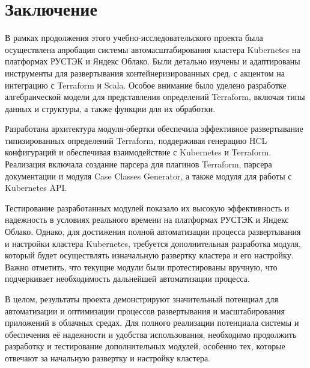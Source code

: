 \chapter*{Заключение}

В рамках продолжения этого учебно-исследовательского проекта была осуществлена
апробация системы автомасштабирования кластера Kubernetes на платформах РУСТЭК и
Яндекс Облако. Были детально изучены и адаптированы инструменты для
развертывания контейнеризированных сред, с акцентом на интеграцию с Terraform и
Scala. Особое внимание было уделено разработке алгебраической модели для
представления определений Terraform, включая типы данных и структуры, а также
функции для их обработки.

Разработана архитектура модуля-обертки обеспечила эффективное развертывание
типизированных определений Terraform, поддерживая генерацию HCL конфигураций и
обеспечивая взаимодействие с Kubernetes и Terraform. Реализация включала
создание парсера для плагинов Terraform, парсера документации и модуля Case
Classes Generator, а также модуля для работы с Kubernetes API.

Тестирование разработанных модулей показало их высокую эффективность и
надежность в условиях реального времени на платформах РУСТЭК и Яндекс Облако.
Однако, для достижения полной автоматизации процесса развертывания и настройки
кластера Kubernetes, требуется дополнительная разработка модуля, который будет
осуществлять изначальную развертку кластера и его настройку. Важно отметить, что
текущие модули были протестированы вручную, что подчеркивает необходимость
дальнейшей автоматизации процесса.

В целом, результаты проекта демонстрируют значительный потенциал для
автоматизации и оптимизации процессов развертывания и масштабирования приложений
в облачных средах. Для полного реализации потенциала системы и обеспечения её
надежности и удобства использования, необходимо продолжить разработку и
тестирование дополнительных модулей, особенно тех, которые отвечают за начальную
развертку и настройку кластера.
